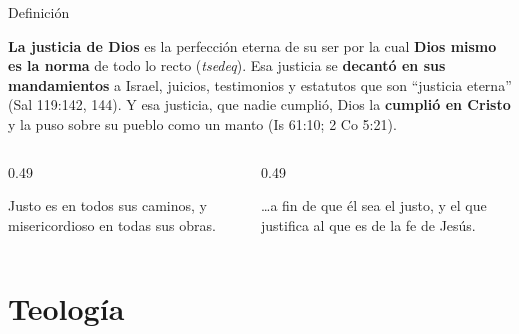 \begin{frame}{Definición}
\begin{tcolorbox}[colback=papiro,colframe=azul,boxrule=1pt,arc=3pt]
\small\textbf{La justicia de Dios} es la perfección eterna de su ser por la cual \textbf{Dios mismo es la norma} de todo lo recto (\emph{tsedeq}). Esa justicia se \textbf{decantó en sus mandamientos} a Israel, juicios, testimonios y estatutos que son ``justicia eterna'' (Sal 119:142, 144). Y esa justicia, que nadie cumplió, Dios la \textbf{cumplió en Cristo} y la puso sobre su pueblo como un manto (Is 61:10; 2 Co 5:21).
\end{tcolorbox}
\begin{columns}[t,onlytextwidth]
\begin{column}{0.49\textwidth}
\begin{cita}Justo es \SENOR{} en todos sus caminos, y misericordioso en todas sus obras.\end{cita}
\end{column}
\begin{column}{0.49\textwidth}
\begin{cita}\ldots{}a fin de que él sea el justo, y el que justifica al que es de la fe de Jesús.\end{cita}
\end{column}
\end{columns}
\end{frame}

\section{Teología}

